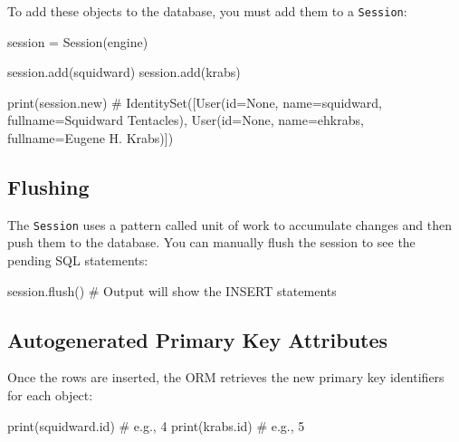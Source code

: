 \documentclass[
  letterpaper,
  DIV=11,
  numbers=noendperiod]{scrreprt}
\newenvironment{Shaded}{\begin{snugshade}}{\end{snugshade}}
\newcommand{\BuiltInTok}[1]{\textcolor[rgb]{0.00,0.23,0.31}{#1}}
\newcommand{\CommentTok}[1]{\textcolor[rgb]{0.37,0.37,0.37}{#1}}
\newcommand{\NormalTok}[1]{\textcolor[rgb]{0.00,0.23,0.31}{#1}}
\newcommand{\OperatorTok}[1]{\textcolor[rgb]{0.37,0.37,0.37}{#1}}
\begin{document}
To add these objects to the database, you must add them to a
\texttt{Session}:

\begin{Shaded}
\begin{Highlighting}[]
\NormalTok{session }\OperatorTok{=}\NormalTok{ Session(engine)}

\NormalTok{session.add(squidward)}
\NormalTok{session.add(krabs)}

\BuiltInTok{print}\NormalTok{(session.new)}
\CommentTok{\# IdentitySet([User(id=None, name=\textquotesingle{}squidward\textquotesingle{}, fullname=\textquotesingle{}Squidward Tentacles\textquotesingle{}), User(id=None, name=\textquotesingle{}ehkrabs\textquotesingle{}, fullname=\textquotesingle{}Eugene H. Krabs\textquotesingle{})])}
\end{Highlighting}
\end{Shaded}

\subsection{Flushing}\label{flushing}

The \texttt{Session} uses a pattern called unit of work to accumulate
changes and then push them to the database. You can manually flush the
session to see the pending SQL statements:

\begin{Shaded}
\begin{Highlighting}[]
\NormalTok{session.flush()}
\CommentTok{\# Output will show the INSERT statements}
\end{Highlighting}
\end{Shaded}

\subsection{Autogenerated Primary Key
Attributes}\label{autogenerated-primary-key-attributes}

Once the rows are inserted, the ORM retrieves the new primary key
identifiers for each object:

\begin{Shaded}
\begin{Highlighting}[]
\BuiltInTok{print}\NormalTok{(squidward.}\BuiltInTok{id}\NormalTok{)  }\CommentTok{\# e.g., 4}
\BuiltInTok{print}\NormalTok{(krabs.}\BuiltInTok{id}\NormalTok{)  }\CommentTok{\# e.g., 5}
\end{Highlighting}
\end{Shaded}
\end{document}

